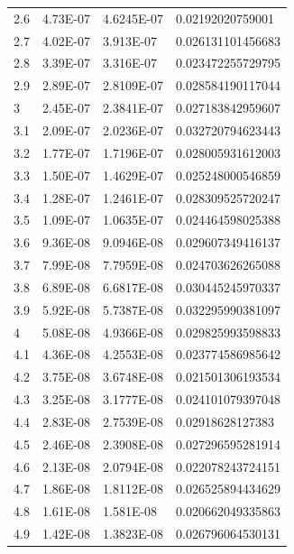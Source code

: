 \documentclass{ctexart}
\begin{document}
\begin{longtable}{l|lll}
2.6  & 4.73E-07                  & 4.6245E-07 & 0.02192020759001      \\
2.7  & 4.02E-07                  & 3.913E-07  & 0.026131101456683     \\
2.8  & 3.39E-07                  & 3.316E-07  & 0.023472255729795     \\
2.9  & 2.89E-07                  & 2.8109E-07 & 0.028584190117044     \\
3    & 2.45E-07                  & 2.3841E-07 & 0.027183842959607     \\
3.1  & 2.09E-07                  & 2.0236E-07 & 0.032720794623443     \\
3.2  & 1.77E-07                  & 1.7196E-07 & 0.028005931612003     \\
3.3  & 1.50E-07                  & 1.4629E-07 & 0.025248000546859     \\
3.4  & 1.28E-07                  & 1.2461E-07 & 0.028309525720247     \\
3.5  & 1.09E-07                  & 1.0635E-07 & 0.024464598025388     \\
3.6  & 9.36E-08                  & 9.0946E-08 & 0.029607349416137     \\
3.7  & 7.99E-08                  & 7.7959E-08 & 0.024703626265088     \\
3.8  & 6.89E-08                  & 6.6817E-08 & 0.030445245970337     \\
3.9  & 5.92E-08                  & 5.7387E-08 & 0.032295990381097     \\
4    & 5.08E-08                  & 4.9366E-08 & 0.029825993598833     \\
4.1  & 4.36E-08                  & 4.2553E-08 & 0.023774586985642     \\
4.2  & 3.75E-08                  & 3.6748E-08 & 0.021501306193534     \\
4.3  & 3.25E-08                  & 3.1777E-08 & 0.024101079397048     \\
4.4  & 2.83E-08                  & 2.7539E-08 & 0.02918628127383      \\
4.5  & 2.46E-08                  & 2.3908E-08 & 0.027296595281914     \\
4.6  & 2.13E-08                  & 2.0794E-08 & 0.022078243724151     \\
4.7  & 1.86E-08                  & 1.8112E-08 & 0.026525894434629     \\
4.8  & 1.61E-08                  & 1.581E-08  & 0.020662049335863     \\
4.9  & 1.42E-08                  & 1.3823E-08 & 0.026796064530131     \\

\end{longtable}
\end{document}
